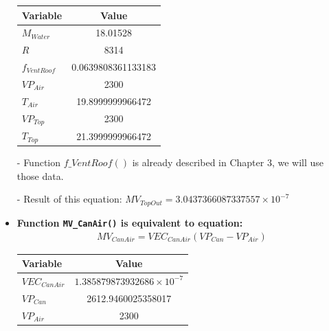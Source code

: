 \documentclass[a4paper]{article}
\numberwithin{equation}{section}
\begin{document}
\begin{itemize}
        \begin{table}[H]
          \centering
          \begin{tabular}{@{}lS[table-format=4.17]@{}}
            \toprule
            \textbf{Variable} & \textbf{Value}     \\
            \midrule
            \( M_{Water} \)     & 18.01528           \\
            \( R \)             & 8314               \\
            \( f_{VentRoof} \)  & 0.0639808361133183 \\
            \( VP_{Air} \)      & 2300               \\
            \( T_{Air} \)       & 19.8999999966472   \\
            \( VP_{Top} \)      & 2300               \\
            \( T_{Top} \)       & 21.3999999966472   \\
            \bottomrule
          \end{tabular}
        \end{table}
  \item [-] Function \hyperref[fVentRoof]{\underline{\( f\_VentRoof() \)}} is already described in Chapter 3, we will use those data.
  \item[-] Result of this equation: \( MV_{TopOut} = 3.0437366087337557 \times 10^{-7} \)

  \item \textbf{Function \texttt{MV\_CanAir()} is equivalent to equation:}
        \begin{align*}
          MV_{CanAir} = VEC_{CanAir}(VP_{Can} - VP_{Air})
        \end{align*}

        \begin{table}[H]
          \centering
          \begin{tabular}{@{}lS[table-format=4.20]@{}}
            \toprule
            \textbf{Variable} & \textbf{Value}                       \\
            \midrule
            \( VEC_{CanAir} \)  & \( 1.385879873932686 \times 10^{-7} \) \\
            \( VP_{Can} \)      & 2612.9460025358017                   \\
            \( VP_{Air} \)      & 2300                                 \\
            \bottomrule
          \end{tabular}
        \end{table}


\end{itemize}
\end{document}
